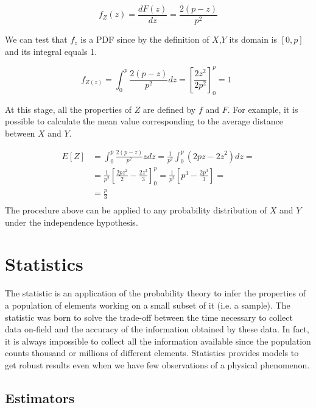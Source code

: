 \begin{equation}
f_Z(z)=\frac{dF(z)}{dz}=\frac{2\left(p-z\right)}{p^2}
\label{eq_Distance6}
\end{equation}

We can test that $f_z$ is a PDF since by the definition of $X$,$Y$ its domain is $[0,p]$ and its integral equals 1.

\begin{equation}
f_{Z\left(z\right)}=\int_{0}^{p}\frac{2\left(p-z\right)}{p^2}dz=\left[\frac{2z^2}{2p^2}\right]_0^p=1\ \ 
\label{eq_Distance7}
\end{equation}

At this stage, all the properties of $Z$ are defined by $f$ and $F$. For example, it is possible to calculate the mean value corresponding to the average distance between $X$ and $Y$. 

\begin{equation}
    \label{eq_Distance8}
    \begin{split}
    E\left[Z\right] & =\int_{0}^{p}\frac{2\left(p-z\right)}{p^2}zdz=\frac{1}{p^2}\int_{0}^{p}\left(2pz-{2z}^2\right)dz= \\
    & =\frac{1}{p^2}\left[\frac{2pz^2}{2}-\frac{{2z}^3}{3}\right]_0^p=\frac{1}{p^2}\left[p^3-\frac{2p^3}{3}\right]= \\
    & = \frac{p}{3} \\
    \end{split}
\end{equation}
The procedure above can be applied to any probability distribution of $X$ and $Y$ under the independence hypothesis.

\section{Statistics} \label{secStatistics}

The statistic is an application of the probability theory to infer the properties of a population of elements working on a small subset of it (i.e. a sample). The statistic was born to solve the trade-off between the time necessary to collect data on-field and the accuracy of the information obtained by these data. In fact, it is always impossible to collect all the information available since the population counts thousand or millions of different elements. Statistics provides models to get robust results even when we have few observations of a physical phenomenon.

\subsection{Estimators} \label{secEstimators}

